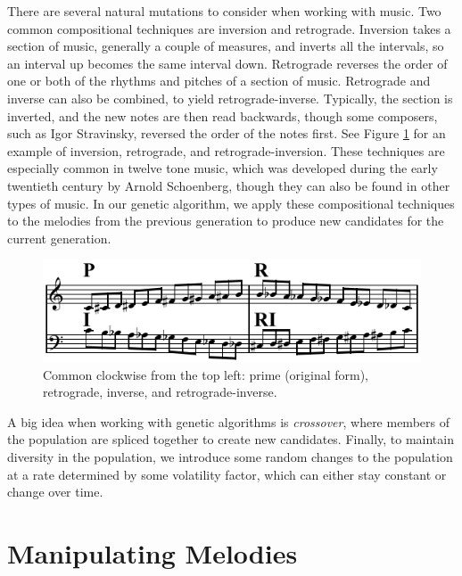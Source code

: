 There are several natural mutations to consider when working with music.
Two common compositional techniques are inversion and retrograde.
Inversion takes a section of music, generally a couple of measures, and inverts all the intervals, so an interval up becomes the same interval down.
Retrograde reverses the order of one or both of the rhythms and pitches of a section of music.
Retrograde and inverse can also be combined, to yield retrograde-inverse.
Typically, the section is inverted, and the new notes are then read backwards, though some composers, such as Igor Stravinsky, reversed the order of the notes first.
See Figure \ref{fig:p-r-i-ri} for an example of inversion, retrograde, and retrograde-inversion.
These techniques are especially common in twelve tone music, which was developed during the early twentieth century by Arnold Schoenberg, though they can also be found in other types of music. %
In our genetic algorithm, we apply these compositional techniques to the melodies from the previous generation to produce new candidates for the current generation.

\begin{figure}
	\centering
	\includegraphics[width=\linewidth]{figures/P-R-I-RI.png} %
	\caption{Common  clockwise from the top left: prime (original form), retrograde, inverse, and retrograde-inverse.}
	\label{fig:p-r-i-ri}
\end{figure}

A big idea when working with genetic algorithms is \textit{crossover}, where members of the population are spliced together to create new candidates.
Finally, to maintain diversity in the population, we introduce some random changes to the population at a rate determined by some volatility factor, which can either stay constant or change over time.

\section{Manipulating Melodies} \label{ga:manip}


